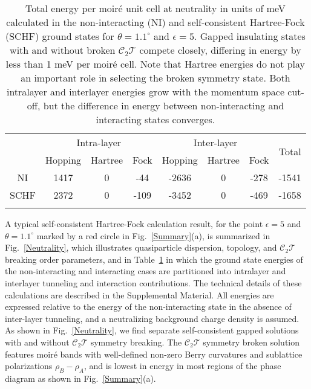 \documentclass[aps,prl,reprint,amssymb,groupedaddress,twocolumn]{revtex4}
\newcommand{\CT}{$\mathcal{C}_2\mathcal{T}$ }
\begin{document}
\begin{table}[t!]
	\begin{tabular}{cccccccc} %
        \hhline{========}
        \multicolumn{1}{c|}{\multirow{2}{*}{E(meV)}} & \multicolumn{3}{c|}{Intra-layer} & \multicolumn{3}{c|}{Inter-layer} & \multirow{2}{*}{Total} \\ \cline{2-7} 
        \multicolumn{1}{c|}{}	& \multicolumn{1}{c|}{Hopping} & \multicolumn{1}{c|}{Hartree} & \multicolumn{1}{c|}{Fock} &  
                                                     \multicolumn{1}{c|}{Hopping} & \multicolumn{1}{c|}{Hartree} & \multicolumn{1}{c|}{Fock} & \\ \hline
          NI       &  1417  &  0  &  -44  &  -2636  &  0  &  -278  &  -1541  \\ 
		 SCHF &  2372 &  0  & -109  &  -3452 &  0  &   -469 &  -1658  \\            \hhline{========}        
	\end{tabular}
	\caption{Total energy per moir\'e unit cell at neutrality in units of meV calculated in the non-interacting (NI)  
		and self-consistent Hartree-Fock (SCHF) ground states for $\theta=1.1^{\circ}$ and $\epsilon=5$.  
		Gapped insulating states with and without broken \CT compete closely, 
		differing in energy by less than 1 meV per moir\'e cell.  Note that Hartree energies do not play an 
		important role in selecting the broken symmetry state.  Both 
		intralayer and interlayer energies grow with the momentum space cut-off, but the difference in energy 
		between non-interacting and interacting states converges.}
		\label{Table1}
\end{table} 

A typical self-consistent Hartree-Fock calculation result, for the point  
$\epsilon=5$ and $\theta=1.1^{\circ}$ marked by a red circle in Fig.~\ref{Summary}(a),
is summarized in Fig.~\ref{Neutrality},
which  illustrates quasiparticle dispersion, topology, and \CT breaking order parameters, 
and in Table~\ref{Table1} in which  the ground state energies of  the non-interacting and
interacting cases are partitioned into intralayer and interlayer tunneling and interaction contributions.  
The technical details of these calculations are described in the Supplemental Material. 
All energies are expressed relative to the energy of 
the non-interacting state in the absence of inter-layer tunneling, and a neutralizing background 
charge density is assumed.  
As shown in Fig.~\ref{Neutrality}, we find separate self-consistent gapped solutions with and without \CT
symmetry breaking. The \CT symmetry broken solution features moir\'{e} bands
with well-defined non-zero Berry curvatures and sublattice polarizations $\rho_B-\rho_A$, and
 is lowest in energy in most regions of the phase diagram as shown in Fig.~\ref{Summary}(a).
\end{document}
